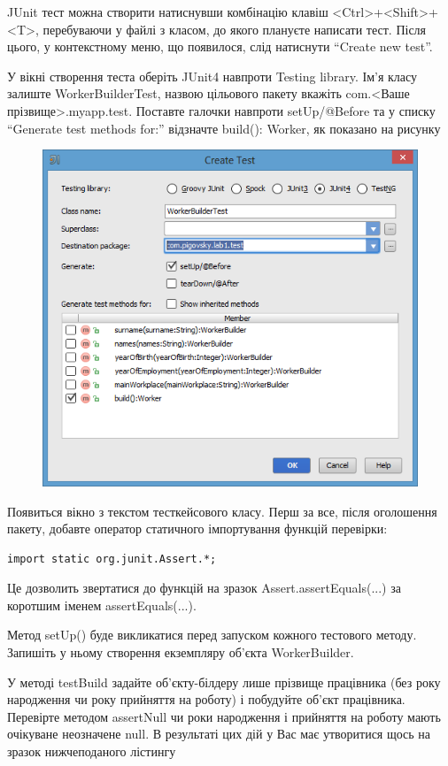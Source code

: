 JUnit тест можна створити натиснувши комбінацію клавіш <Ctrl>+<Shift>+<T>, перебуваючи у файлі з класом, до якого плануєте написати тест. Після цього, у контекстному меню, що появилося, слід натиснути ``Create new test''. 

У вікні створення теста оберіть JUnit4 навпроти Testing library. Ім'я класу залиште WorkerBuilderTest, назвою цільового пакету вкажіть com.<Ваше прізвище>.myapp.test. Поставте галочки навпроти setUp/@Before та у списку ``Generate test methods for:'' відзначте build(): Worker, як показано на рисунку
\begin{figure}[H]
\includegraphics{createTest}
\end{figure}
Появиться вікно з текстом тесткейсового класу. Перш за все, після оголошення пакету, добавте оператор статичного імпортування функцій перевірки:
\begin{lstlisting}
import static org.junit.Assert.*;
\end{lstlisting}
Це дозволить звертатися до функцій на зразок Assert.assertEquals(...) за коротшим іменем assertEquals(...).

Метод setUp() буде викликатися перед запуском кожного тестового методу. Запишіть у ньому створення екземпляру об'єкта WorkerBuilder.

У методі testBuild задайте об'єкту-білдеру лише прізвище працівника (без року народження чи року прийняття на роботу) і побудуйте об'єкт працівника. Перевірте методом assertNull чи роки народження і прийняття на роботу мають очікуване неозначене null.
В результаті цих дій у Вас має утворитися щось на зразок нижчеподаного лістингу


